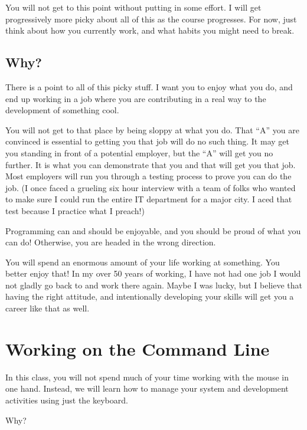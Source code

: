 \documentclass[letterpaper,11pt,english]{sphinxmanual}
\begin{document}
You will not get to this point without putting in some effort. I will get
progressively more picky about all of this as the course progresses. For now,
just think about how you currently work, and what habits you might need to
break.


\section{Why?}
\label{\detokenize{01_introduction/are-you-ready-to-code:why}}
There is a point to all of this picky stuff. I want you to enjoy what you do,
and end up working in a job where you are contributing in a real way to the
development of something cool.

You will not get to that place by being sloppy at what you do. That “A” you are
convinced is essential to getting you that job will do no such thing. It may
get you standing in front of a potential employer, but the “A” will get you no
further. It is what you can demonstrate that you  and  that will
get you that job. Most employers will run you through a testing process to
prove you can do the job. (I once faced a grueling six hour interview with a
team of folks who wanted to make sure I could run the entire IT department for
a major city. I aced that test because I practice what I preach!)

Programming can and should be enjoyable, and you should be proud of what you
can do! Otherwise, you are headed in the wrong direction.

You will spend an enormous amount of your life working at something. You better
enjoy that! In my over 50 years of working, I have not had one job I would not
gladly go back to and work there again. Maybe I was lucky, but I believe that
having the right attitude, and intentionally developing your skills will get
you a career like that as well.


\chapter{Working on the Command Line}
\label{\detokenize{appendix/working-on-the-command-line::doc}}\label{\detokenize{appendix/working-on-the-command-line:working-on-the-command-line}}
In this class, you will not spend much of your time working with the mouse in one hand. Instead, we will learn how to manage your system and development activities using just the keyboard.

Why?
\end{document}
